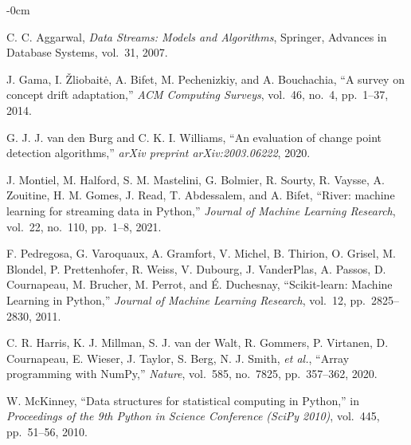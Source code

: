 \documentclass[journal,article,submit,pdftex,moreauthors]{Definitions/mdpi}
\begin{document}
\begin{adjustwidth}{-\extralength}{0cm}
\begin{thebibliography}{999}
C. C. Aggarwal, \textit{Data Streams: Models and Algorithms}, Springer, Advances in Database Systems, vol.~31, 2007.

J. Gama, I. Žliobaitė, A. Bifet, M. Pechenizkiy, and A. Bouchachia, ``A survey on concept drift adaptation,'' \textit{ACM Computing Surveys}, vol.~46, no.~4, pp.~1--37, 2014.

G. J. J. van den Burg and C. K. I. Williams, ``An evaluation of change point detection algorithms,'' \textit{arXiv preprint arXiv:2003.06222}, 2020.

J. Montiel, M. Halford, S. M. Mastelini, G. Bolmier, R. Sourty, R. Vaysse, A. Zouitine, H. M. Gomes, J. Read, T. Abdessalem, and A. Bifet, ``River: machine learning for streaming data in Python,'' \textit{Journal of Machine Learning Research}, vol.~22, no.~110, pp.~1--8, 2021.

F. Pedregosa, G. Varoquaux, A. Gramfort, V. Michel, B. Thirion, O. Grisel, M. Blondel, P. Prettenhofer, R. Weiss, V. Dubourg, J. VanderPlas, A. Passos, D. Cournapeau, M. Brucher, M. Perrot, and É. Duchesnay, ``Scikit-learn: Machine Learning in Python,'' \textit{Journal of Machine Learning Research}, vol.~12, pp.~2825--2830, 2011.

C. R. Harris, K. J. Millman, S. J. van der Walt, R. Gommers, P. Virtanen, D. Cournapeau, E. Wieser, J. Taylor, S. Berg, N. J. Smith, \textit{et al.}, ``Array programming with NumPy,'' \textit{Nature}, vol.~585, no.~7825, pp.~357--362, 2020.

W. McKinney, ``Data structures for statistical computing in Python,'' in \textit{Proceedings of the 9th Python in Science Conference (SciPy 2010)}, vol.~445, pp.~51--56, 2010.


\end{thebibliography}

%



\end{adjustwidth}
\end{document}
